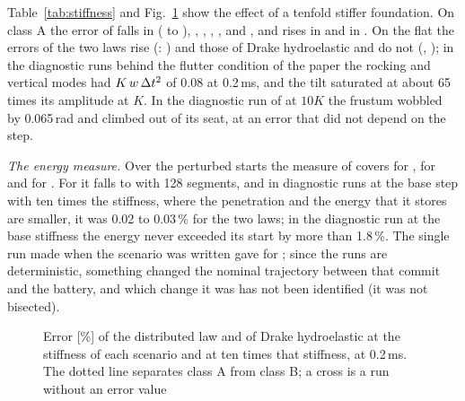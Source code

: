 Table~\ref{tab:stiffness} and Fig.~\ref{fig:stiffness} show the effect of a tenfold stiffer
foundation. On class A the error of  falls in 
( to ), ,
, , ,  and , and rises in
 and in . On the flat  the errors of the two laws rise
(: ) and those of Drake hydroelastic and
 do not (, ); in the
diagnostic runs behind the flutter condition of the paper the rocking and vertical modes had
$K\,w\,\Delta t^2$ of 0.08 at 0.2\,ms, and the tilt saturated at about 65 times its amplitude at
$K$. In the diagnostic run of  at $10K$ the frustum wobbled by 0.065\,rad and climbed
out of its seat, at an error that did not depend on the step.

\emph{The energy measure.} Over the perturbed starts the measure of  covers
 for ,
 for  and
 for . For  it falls
to  with 128 segments, and in diagnostic runs at the base
step with ten times the stiffness, where the penetration and the energy that it stores are
smaller, it was 0.02 to 0.03\,\% for the two laws; in the diagnostic run at the base stiffness
the energy never exceeded its start by more than 1.8\,\%.
The single run made when the scenario was written gave  for
; since the runs are deterministic, something changed the nominal trajectory
between that commit and the battery, and which change it was has not been identified (it was
not bisected).

\begin{table}[!htbp]
\caption{Error [\%] at the stiffness of the scenario and at ten times that stiffness
($K \to 10K$), both at 0.2\,ms, classes A and B}
\label{tab:stiffness}
\end{table}

\begin{figure}[!htbp]
\centering
{}
\caption{Error [\%] of the distributed law and of Drake hydroelastic at the stiffness of each
scenario and at ten times that stiffness, at 0.2\,ms. The dotted line separates class A from
class B; a cross is a run without an error value}
\label{fig:stiffness}
\end{figure}

